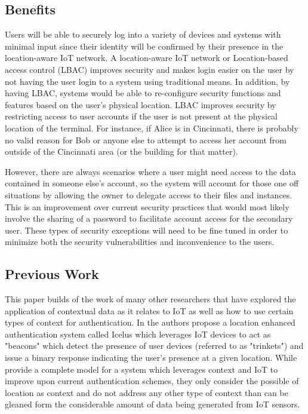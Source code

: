 \documentclass[11pt,journal]{IEEEtran}
\begin{document}
\subsection{Benefits}
Users will be able to securely log into a variety of devices and systems with minimal input since their identity will be confirmed by their presence in the location-aware IoT network.  A location-aware IoT network or Location-based access control (LBAC) improves security and makes login easier on the user by not having the user login to a system using traditional means.  In addition, by having LBAC, systems would be able to re-configure security functions and features based on the user’s physical location.  LBAC improves security by restricting access to user accounts if the user is not present at the physical location of the terminal.  For instance, if Alice is in Cincinnati, there is probably no valid reason for Bob or anyone else to attempt to access her account from outside of the Cincinnati area (or the building for that matter).  

However, there are always scenarios where a user might need access to the data contained in someone else’s account, so the system will account for those one off situations by allowing the owner to delegate access to their files and instances.  This is an improvement over current security practices that would most likely involve the sharing of a password to facilitate account access for the secondary user.  These types of security exceptions will need to be fine tuned in order to minimize both the security vulnerabilities and inconvenience to the users.

\subsection{Previous Work}
This paper builds of the work of many other researchers that have explored the application of contextual data as it relates to IoT as well as how to use certain types of context for authentication.  In \citet{Agadakos:2016:LAU:2991079.2991090} the authors propose a location enhanced authentication system called Icelus which leverages IoT devices to act as "beacons" which detect the presence of user devices (referred to as "trinkets") and issue a binary response indicating the user's presence at a given location.  While \citeauthor{Agadakos:2016:LAU:2991079.2991090} provide a complete model for a system which leverages context and IoT to improve upon current authentication schemes, they only consider the possible of location as context and do not address any other type of context than can be gleaned form the considerable amount of data being generated from IoT sensors.
\end{document}
